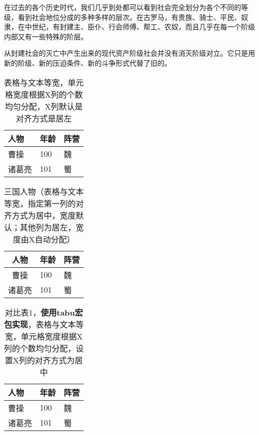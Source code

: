 \documentclass{ctexart}
\begin{document}
在过去的各个历史时代，我们几乎到处都可以看到社会完全划分为各个不同的等级，看到社会地位分成的多种多样的层次。在古罗马，有贵族、骑士、平民、奴隶，在中世纪，有封建主、臣仆、行会师傅、帮工、农奴，而且几乎在每一个阶级内部又有一些特殊的阶层。

从封建社会的灭亡中产生出来的现代资产阶级社会并没有消灭阶级对立。它只是用新的阶级、新的压迫条件、新的斗争形式代替了旧的。

\begin{table}[h]
	\caption{表格与文本等宽，单元格宽度根据X列的个数均匀分配，X列默认是对齐方式是居左}
	\label{tab::kingdom-A}
	\begin{tabularx}{\linewidth}{X|X|X}
		\toprule
		人物  & 年龄  & 阵营 \\
		\midrule
		曹操  & 100 & 魏  \\
		诸葛亮 & 101 & 蜀  \\
		\bottomrule
	\end{tabularx}
\end{table}

\begin{table}[h]
	\caption{三国人物（表格与文本等宽，指定第一列的对齐方式为居中，宽度默认；其他列为居左，宽度由X自动分配）}
	\label{tab::kingdom-B}
	\begin{tabularx}{\linewidth}{c|X|X}
		\toprule
		人物  & 年龄  & 阵营 \\
		\midrule
		曹操  & 100 & 魏  \\
		诸葛亮 & 101 & 蜀  \\
		\bottomrule
	\end{tabularx}
\end{table}

\begin{table}[h]
	\caption{对比表1，\textbf{使用tabu宏包实现}，表格与文本等宽，单元格宽度根据X列的个数均匀分配，设置X列的对齐方式为居中}
	\label{tab::kingdom-C}
	\begin{tabu} to \linewidth {X[c]|X[c]|X[c]}
		\toprule
		人物  & 年龄  & 阵营 \\
		\midrule
		曹操  & 100 & 魏  \\
		诸葛亮 & 101 & 蜀  \\
		\bottomrule
	\end{tabu}
\end{table}
\end{document}
